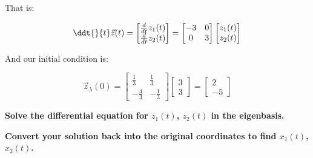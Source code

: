 \begin{enumerate}
{That is:

	$$\ddt{}{t} \vec{z}(t) = \begin{bmatrix}\frac{d}{dt} z_{1}(t) \\ \frac{d}{dt}z_{2}(t)\end{bmatrix} = \begin{bmatrix}-3 & 0 \\ 0 & 3\end{bmatrix}\begin{bmatrix}z_{1}(t) \\ z_{2}(t)\end{bmatrix}$$

And our initial condition is:

$$\vec z_{\lambda}(0) = \begin{bmatrix}\frac{1}{3} & \frac{1}{3} \\ -\frac{4}{3} & -\frac{1}{3}\end{bmatrix}\begin{bmatrix} 3 \\ 3 \end{bmatrix} = \begin{bmatrix} 2 \\ -5 \end{bmatrix} $$
}

\qitem \textbf{Solve the differential equation for $z_{1}(t)$, $z_{2}(t)$ in the eigenbasis.}

\ws{
	\vspace{150px}
}


\qitem \textbf{Convert your solution back into the original coordinates to find $x_1(t)$, $x_2(t)$.}




\end{enumerate}
